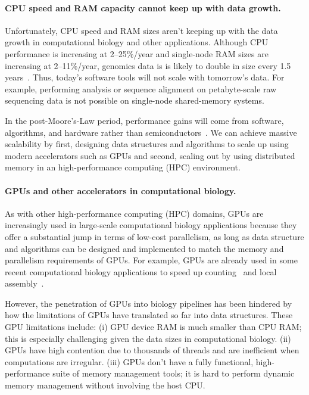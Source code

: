 \label{sec:we-need-performance-and-scalability}
\paragraph{CPU speed and RAM capacity cannot keep up with data growth.}
Unfortunately, CPU speed and RAM sizes aren't keeping up with the data growth in computational biology and other applications.
Although CPU performance is increasing at 2--25\%/year and single-node RAM sizes are increasing at 2--11\%/year, genomics data is is likely to double in size every 1.5 years~\cite{kodama2012sequence}.
Thus, today's software tools will not scale with tomorrow's data. For example, performing \kmer analysis or sequence alignment on petabyte-scale raw sequencing data is not possible on single-node shared-memory systems.

In the post-Moore’s-Law period, performance gains will come from software, algorithms, and hardware rather than semiconductors~\cite{leiserson2020there}. We can achieve massive scalability by first, designing data structures and algorithms to scale up using modern accelerators such as GPUs and second, scaling out by using distributed memory in an high-performance computing (HPC) environment.



\paragraph{GPUs and other accelerators in computational biology.}
As with other high-performance computing (HPC) domains,
GPUs are increasingly used in large-scale computational biology applications because they offer a substantial jump in terms of low-cost parallelism, as long as data structure and algorithms can be designed and implemented to match the memory and parallelism requirements of GPUs.
%
For example, GPUs are already used in some recent computational biology applications to speed up \kmer counting~\cite{nisa2021distributed} and local assembly~\cite{awan2021accelerating}.

However, the penetration of GPUs into biology pipelines has been hindered by how the limitations of GPUs have translated so far into data structures.  These GPU limitations include: (i) GPU device RAM is much smaller than CPU RAM\@; this is especially
challenging given the data sizes in computational biology. (ii) GPUs have high contention due to thousands of threads and are
inefficient when computations are irregular. (iii) GPUs don't have a fully functional, high-performance suite of memory management tools; it is hard to perform dynamic memory management without involving the host CPU\@. 

